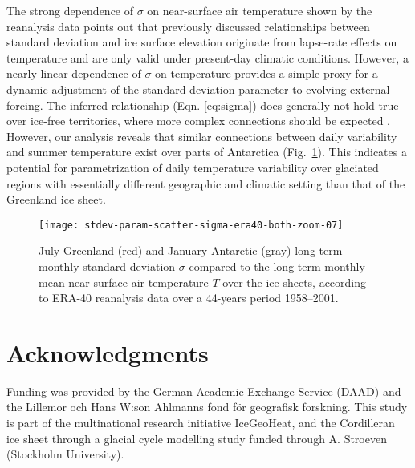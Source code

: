 \documentclass[review]{igs}
\begin{document}
The strong dependence of $\sigma$ on near-surface air temperature shown by the reanalysis data points out that previously discussed relationships between standard deviation and ice surface elevation \citep{fausto-etal-2009,fausto-etal-2011} originate from lapse-rate effects on temperature and are only valid under present-day climatic conditions. However, a nearly linear dependence of $\sigma$ on temperature provides a simple proxy for a dynamic adjustment of the standard deviation parameter to evolving external forcing. The inferred relationship (Eqn. \ref{eq:sigma}) does generally not hold true over ice-free territories, where more complex connections should be expected \citep{seguinot-2013}. However, our analysis reveals that similar connections between daily variability and summer temperature exist over parts of Antarctica (Fig.~\ref{fig:both}). This indicates a potential for parametrization of daily temperature variability over glaciated regions with essentially different geographic and climatic setting than that of the Greenland ice sheet.

\begin{figure}
    \centering\texttt{[image: stdev-param-scatter-sigma-era40-both-zoom-07]}
    \caption{July Greenland (red) and January Antarctic (gray) long-term monthly standard deviation $\sigma$ compared to the long-term monthly mean near-surface air temperature $T$ over the ice sheets, according to ERA-40 reanalysis data \citep{uppala-etal-2005} over a 44-years period 1958–2001.}
    \label{fig:both}
\end{figure}


\section{Acknowledgments}

Funding was provided by the German Academic Exchange Service (DAAD) and the Lillemor och Hans W:son Ahlmanns fond för geografisk forskning. This study is part of the multinational research initiative IceGeoHeat, and the Cordilleran ice sheet through a glacial cycle modelling study funded through A. Stroeven (Stockholm University).



\end{document}
